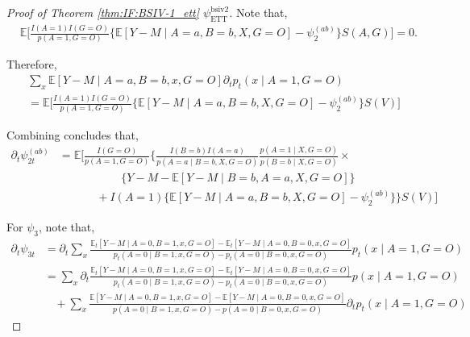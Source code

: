 \documentclass[10pt]{article}
\begin{document}
\begin{proof}[Proof of Theorem \ref{thm:IF:BSIV-1_ett} $\psi_{\text{ETT}}^{\text{bsiv2}}$]
Note that,
\begin{align*}
    &\mathbb{E}\bigg[\frac{I(A=1)I(G=O)}{p(A=1, G=O)}\bigg\{\mathbb{E}[Y-M\mid A=a,B=b,X,G=O]-\psi_2^{(ab)}\bigg\}S(A,G)\bigg]=0.
\end{align*}

Therefore,
\begin{align*}
    &\sum_{x}\mathbb{E}[Y-M\mid A=a,B=b,x,G=O]\partial_tp_t(x\mid A=1, G=O)\\
    &=\mathbb{E}\bigg[\frac{I(A=1)I(G=O)}{p(A=1, G=O)}\bigg\{\mathbb{E}[Y-M\mid A=a,B=b,X,G=O]-\psi_2^{(ab)}\bigg\}S(V)\bigg]
\end{align*}

Combining concludes that,
\begin{align*}
    \partial_t\psi_{2t}^{(ab)}&=\mathbb{E}\bigg[\frac{I(G=O)}{p(A=1, G=O)}\bigg\{\frac{I(B=b)I(A=a)}{p(A=a\mid B=b,X,G=O)}\frac{p(A=1\mid X, G=O)}{p(B=b\mid X,G=O)}\times\\
    &~~~~~~~~~~~~~~~~~~~~~~~~~\{Y-M-\mathbb{E}[Y-M\mid B=b,A=a,X,G=O]\}\\
    &~~~~~~~~~~~~~~~+I(A=1)\{\mathbb{E}[Y-M\mid A=a,B=b,X,G=O]-\psi_2^{(ab)}\}\bigg\}S(V)\bigg]
\end{align*}


For $\psi_3$, note that,
{\footnotesize \begin{align*}
    \partial_t\psi_{3t}&=\partial_t\sum_{x}\frac{\mathbb{E}_t[Y-M\mid A=0,B=1,x,G=O]-\mathbb{E}_t[Y-M\mid A=0,B=0,x,G=O]}{p_t(A=0\mid B=1,x,G=O)-p_t(A=0\mid B=0,x,G=O)}p_t(x\mid A=1,G=O)\\
    &=\sum_{x}\partial_t\frac{\mathbb{E}_t[Y-M\mid A=0,B=1,x,G=O]-\mathbb{E}_t[Y-M\mid A=0,B=0,x,G=O]}{p_t(A=0\mid B=1,x,G=O)-p_t(A=0\mid B=0,x,G=O)}p(x\mid A=1,G=O)\\
    &\ \ \ \ +\sum_{x}\frac{\mathbb{E}[Y-M\mid A=0,B=1,x,G=O]-\mathbb{E}[Y-M\mid A=0,B=0,x,G=O]}{p(A=0\mid B=1,x,G=O)-p(A=0\mid B=0,x,G=O)}\partial_tp_t(x\mid A=1,G=O)
\end{align*}}


\end{proof}
\end{document}
